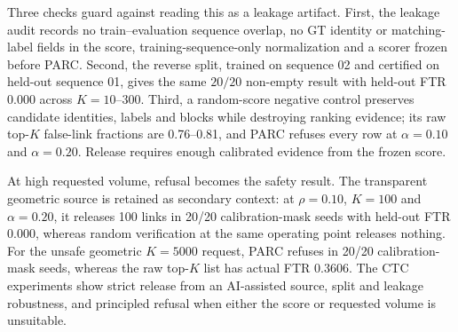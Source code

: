 \documentclass[10pt,twocolumn]{article}
\begin{document}
Three checks guard against reading this as a leakage artifact.
First, the leakage audit records no train--evaluation sequence overlap, no GT identity or matching-label fields in the score, training-sequence-only normalization and a scorer frozen before PARC.
Second, the reverse split, trained on sequence 02 and certified on held-out sequence 01, gives the same \(20/20\) non-empty result with held-out FTR 0.000 across \(K=10\)--300.
Third, a random-score negative control preserves candidate identities, labels and blocks while destroying ranking evidence; its raw top-\(K\) false-link fractions are 0.76--0.81, and PARC refuses every row at \(\alpha=0.10\) and \(\alpha=0.20\).
Release requires enough calibrated evidence from the frozen score.

At high requested volume, refusal becomes the safety result.
The transparent geometric source is retained as secondary context: at \(\rho=0.10\), \(K=100\) and \(\alpha=0.20\), it releases 100 links in 20/20 calibration-mask seeds with held-out FTR 0.000, whereas random verification at the same operating point releases nothing.
For the unsafe geometric \(K=5000\) request, PARC refuses in 20/20 calibration-mask seeds, whereas the raw top-\(K\) list has actual FTR 0.3606.
The CTC experiments show strict release from an AI-assisted source, split and leakage robustness, and principled refusal when either the score or requested volume is unsuitable.
\end{document}

